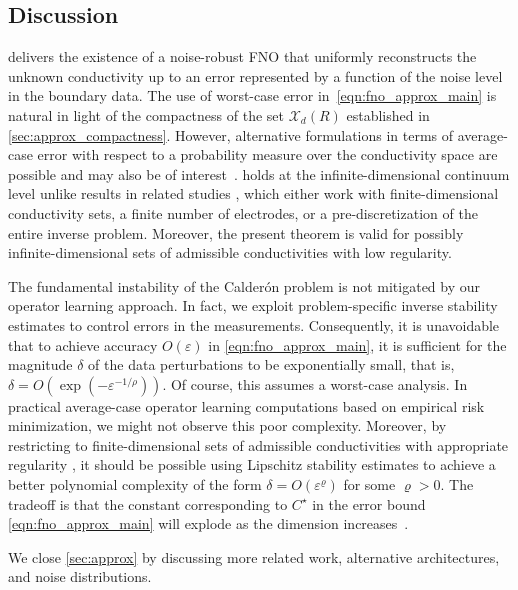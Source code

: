 \documentclass[pdflatex,sn-mathphys-num]{sn-jnl-preprint}
\newcommand{\cX}{\mathcal{X}}
\newcommand{\ep}{\varepsilon}
\theoremstyle{thmstyleone}%
\theoremstyle{thmstyletwo}%
\theoremstyle{thmstylethree}%
\numberwithin{equation}{section}
\numberwithin{theorem}{section}
\begin{document}
\subsection{Discussion}\label{sec:approx_discuss}
 delivers the existence of a noise-robust FNO that uniformly reconstructs the unknown conductivity up to an error represented by a function of the noise level in the boundary data. The use of worst-case error in~\eqref{eqn:fno_approx_main} is natural in light of the compactness of the set $\cX_d(R)$ established in \cref{sec:approx_compactness}. However, alternative formulations in terms of average-case error with respect to a probability measure over the conductivity space are possible \cite[e.g., following Thm.~18]{kovachki2021universal} and may also be of interest~\cite{castro2024calderon}.
 holds at the infinite-dimensional continuum level unlike results in related studies \cite{abhishek2024solving,pineda2023deep}, which either work with finite-dimensional conductivity sets, a finite number of electrodes, or a pre-discretization of the entire inverse problem. Moreover, the present theorem is valid for possibly infinite-dimensional sets of admissible conductivities with low regularity. 

The fundamental instability of the Calder\'on problem is not mitigated by our operator learning approach. In fact, we exploit problem-specific inverse stability estimates to control errors in the measurements. Consequently, it is unavoidable that to achieve accuracy $O(\ep)$ in \eqref{eqn:fno_approx_main}, it is sufficient for the magnitude $\delta$ of the data perturbations to be exponentially small, that is, $\delta=O(\exp(-\ep^{-1/\rho}))$. Of course, this assumes a worst-case analysis. In practical average-case operator learning computations based on empirical risk minimization, we might not observe this poor complexity.
Moreover, by restricting to finite-dimensional sets of admissible conductivities with appropriate regularity \cite{abhishek2024solving,pineda2023deep}, it should be possible using Lipschitz stability estimates \cite{alberti2022infinite} to achieve a better polynomial complexity of the form $\delta=O(\ep^{\varrho})$ for some $\varrho>0$. The tradeoff is that the constant corresponding to $C^\star$ in the error bound \eqref{eqn:fno_approx_main} will explode as the dimension increases~\cite{alberti2022infinite}.

We close \cref{sec:approx} by discussing more related work, alternative architectures, and noise distributions.
\end{document}
